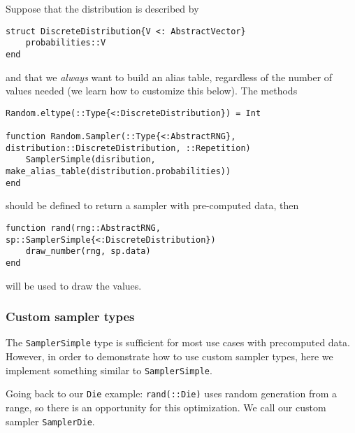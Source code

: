 Suppose that the distribution is described by




\begin{verbatim}
struct DiscreteDistribution{V <: AbstractVector}
    probabilities::V
end
\end{verbatim}



and that we \emph{always} want to build an alias table, regardless of the number of values needed (we learn how to customize this below). The methods




\begin{verbatim}
Random.eltype(::Type{<:DiscreteDistribution}) = Int

function Random.Sampler(::Type{<:AbstractRNG}, distribution::DiscreteDistribution, ::Repetition)
    SamplerSimple(disribution, make_alias_table(distribution.probabilities))
end
\end{verbatim}



should be defined to return a sampler with pre-computed data, then




\begin{verbatim}
function rand(rng::AbstractRNG, sp::SamplerSimple{<:DiscreteDistribution})
    draw_number(rng, sp.data)
end
\end{verbatim}



will be used to draw the values.



\hypertarget{4100919623062869062}{}


\subsubsection{Custom sampler types}



The \texttt{SamplerSimple} type is sufficient for most use cases with precomputed data. However, in order to demonstrate how to use custom sampler types, here we implement something similar to \texttt{SamplerSimple}.



Going back to our \texttt{Die} example: \texttt{rand(::Die)} uses random generation from a range, so there is an opportunity for this optimization. We call our custom sampler \texttt{SamplerDie}.




